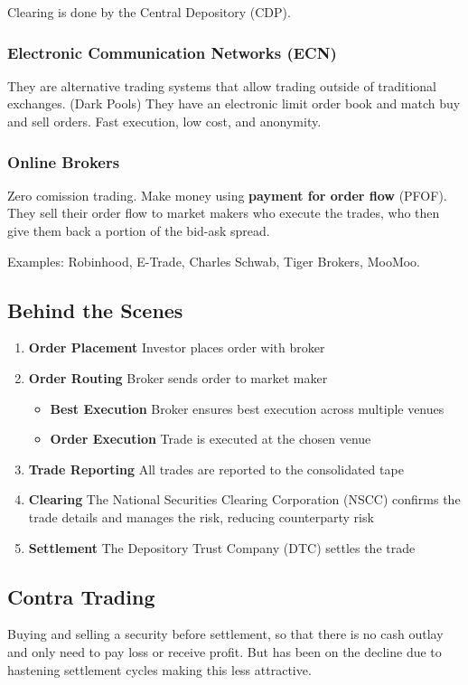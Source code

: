 Clearing is done by the Central Depository (CDP).

\subsubsection{Electronic Communication Networks (ECN)}
They are alternative trading systems that allow trading outside of traditional exchanges. (Dark Pools)
They have an electronic limit order book and match buy and sell orders.
Fast execution, low cost, and anonymity.

\subsubsection{Online Brokers}
Zero comission trading.
Make money using \textbf{payment for order flow} (PFOF).
They sell their order flow to market makers who execute the trades, who then give them back a portion of the bid-ask spread.

Examples: Robinhood, E-Trade, Charles Schwab, Tiger Brokers, MooMoo.

\subsection{Behind the Scenes}
	\begin{enumerate}
		\item \textbf{Order Placement} Investor places order with broker
		\item \textbf{Order Routing} Broker sends order to market maker
			\begin{itemize}
			\item \textbf{Best Execution} Broker ensures best execution across multiple venues
		\item \textbf{Order Execution} Trade is executed at the chosen venue
			
			\end{itemize}
		\item \textbf{Trade Reporting} All trades are reported to the consolidated tape
		\item \textbf{Clearing} The National Securities Clearing Corporation (NSCC) confirms the trade details and manages the risk, reducing counterparty risk
		\item \textbf{Settlement} The Depository Trust Company (DTC) settles the trade
	\end{enumerate}

\subsection{Contra Trading}
Buying and selling a security before settlement, so that there is no cash outlay and only need to pay loss or receive profit. But has been on the decline due to hastening settlement cycles making this less attractive.

